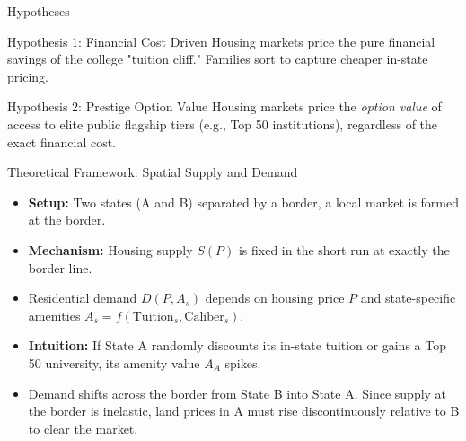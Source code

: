 \documentclass[10pt, aspectratio=169]{beamer}
\begin{document}
\begin{frame}{Hypotheses}
    \begin{block}{Hypothesis 1: Financial Cost Driven}
    Housing markets price the pure financial savings of the college "tuition cliff." Families sort to capture cheaper in-state pricing.
    \end{block}
    
    \vspace{0.5cm}
    
    \begin{block}{Hypothesis 2: Prestige Option Value}
    Housing markets price the \textit{option value} of access to elite public flagship tiers (e.g., Top 50 institutions), regardless of the exact financial cost.
    \end{block}
\end{frame}

\begin{frame}{Theoretical Framework: Spatial Supply and Demand}
    \begin{itemize}
        \item \textbf{Setup:} Two states (A and B) separated by a border, a local market is formed at the border.
        \item \textbf{Mechanism:} Housing supply $S(P)$ is fixed in the short run at exactly the border line. 
        \item Residential demand $D(P, A_s)$ depends on housing price $P$ and state-specific amenities $A_s = f(\text{Tuition}_s, \text{Caliber}_s)$.
        \item \textbf{Intuition:} If State A randomly discounts its in-state tuition or gains a Top 50 university, its amenity value $A_A$ spikes. 
        \item Demand shifts across the border from State B into State A. Since supply at the border is inelastic, land prices in A must rise discontinuously relative to B to clear the market.
    \end{itemize}
\end{frame}
\end{document}
